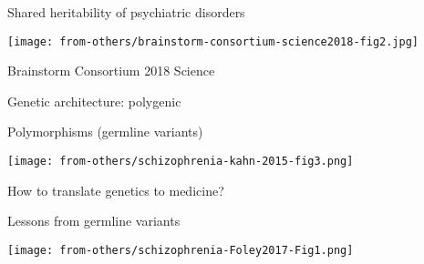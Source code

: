 \documentclass[usenames,dvipsnames]{beamer}
\begin{document}
\begin{frame}{Shared heritability of psychiatric disorders}
\begin{center}
\texttt{[image: from-others/brainstorm-consortium-science2018-fig2.jpg]}
\end{center}

{\tiny Brainstorm Consortium 2018 Science}
\end{frame}

\begin{frame}{Genetic architecture: polygenic}
\begin{center}
	Polymorphisms (germline variants)

\texttt{[image: from-others/schizophrenia-kahn-2015-fig3.png]}
\end{center}
\end{frame}

\begin{frame}{How to translate genetics to medicine?}
\begin{center}
Lessons from germline variants
\end{center}

\texttt{[image: from-others/schizophrenia-Foley2017-Fig1.png]}
\end{frame}
\end{document}
